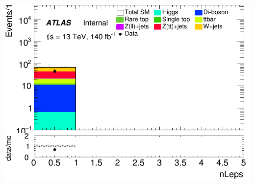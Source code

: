 \documentclass[usenames,dvipsnames]{beamer}
\begin{document}
\begin{frame}
\begin{minipage}{0.32\textwidth}
        \includegraphics[width=\textwidth]{graphics/HHH_met/HHH_met_nLeps.png}
    \end{minipage}
    
    \vspace{0.5cm} %


\end{frame}
\end{document}
